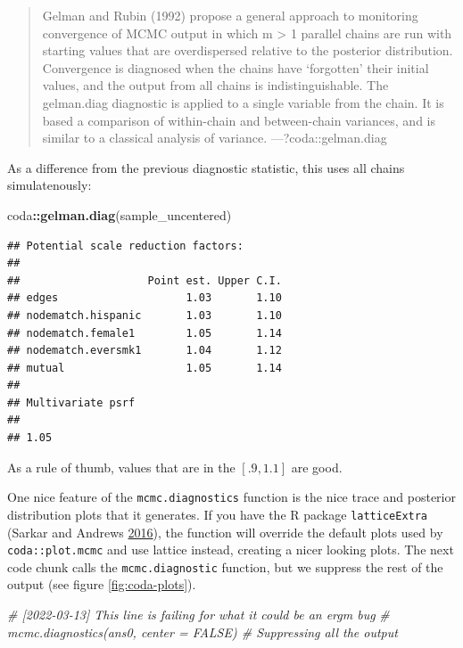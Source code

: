 \documentclass[]{book}
\newenvironment{Shaded}{\begin{snugshade}}{\end{snugshade}}
\newcommand{\CommentTok}[1]{\textcolor[rgb]{0.56,0.35,0.01}{\textit{#1}}}
\newcommand{\KeywordTok}[1]{\textcolor[rgb]{0.13,0.29,0.53}{\textbf{#1}}}
\newcommand{\NormalTok}[1]{#1}
\newcommand{\OperatorTok}[1]{\textcolor[rgb]{0.81,0.36,0.00}{\textbf{#1}}}
\begin{document}
\begin{enumerate}
  \begin{quote}
  Gelman and Rubin (1992) propose a general approach to monitoring convergence of MCMC output in which m \textgreater{} 1 parallel chains are run with starting values that are overdispersed relative to the posterior distribution. Convergence is diagnosed when the chains have `forgotten' their initial values, and the output from all chains is indistinguishable. The gelman.diag diagnostic is applied to a single variable from the chain. It is based a comparison of within-chain and between-chain variances, and is similar to a classical analysis of variance.
  ---?coda::gelman.diag
  \end{quote}

  As a difference from the previous diagnostic statistic, this uses all chains simulatenously:

\begin{Shaded}
\begin{Highlighting}[]
\NormalTok{coda}\OperatorTok{::}\KeywordTok{gelman.diag}\NormalTok{(sample_uncentered)}
\end{Highlighting}
\end{Shaded}

\begin{verbatim}
## Potential scale reduction factors:
## 
##                    Point est. Upper C.I.
## edges                    1.03       1.10
## nodematch.hispanic       1.03       1.10
## nodematch.female1        1.05       1.14
## nodematch.eversmk1       1.04       1.12
## mutual                   1.05       1.14
## 
## Multivariate psrf
## 
## 1.05
\end{verbatim}

  As a rule of thumb, values that are in the \([.9,1.1]\) are good.
\end{enumerate}

One nice feature of the \texttt{mcmc.diagnostics} function is the nice trace and posterior distribution plots that it generates. If you have the R package \texttt{latticeExtra} (Sarkar and Andrews \protect\hyperlink{ref-R-latticeExtra}{2016}), the function will override the default plots used by \texttt{coda::plot.mcmc} and use lattice instead, creating a nicer looking plots. The next code chunk calls the \texttt{mcmc.diagnostic} function, but we suppress the rest of the output (see figure \ref{fig:coda-plots}).

\begin{Shaded}
\begin{Highlighting}[]
\CommentTok{# [2022-03-13] This line is failing for what it could be an ergm bug}
\CommentTok{# mcmc.diagnostics(ans0, center = FALSE) # Suppressing all the output}
\end{Highlighting}
\end{Shaded}
\end{document}
